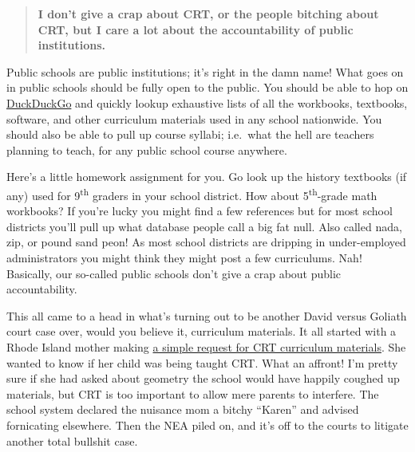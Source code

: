 \begin{quote}
\textbf{I don't give a crap about CRT, or the people bitching about CRT,
but I care a lot about the accountability of public institutions.}
\end{quote}

Public schools are public institutions; it's right in the damn name!
What goes on in public schools should be fully open to the public. You
should be able to hop on \href{https://duckduckgo.com/}{DuckDuckGo} and
quickly lookup exhaustive lists of all the workbooks, textbooks,
software, and other curriculum materials used in any school nationwide.
You should also be able to pull up course syllabi; i.e.~what the hell
are teachers planning to teach, for any public school course anywhere.

Here's a little homework assignment for you. Go look up the history
textbooks (if any) used for 9\textsuperscript{th} graders in your school
district. How about 5\textsuperscript{th}-grade math workbooks? If
you're lucky you might find a few references but for most school
districts you'll pull up what database people call a big fat null. Also
called nada, zip, or pound sand peon! As most school districts are
dripping in under-employed administrators you might think they might
post a few curriculums. Nah! Basically, our so-called public schools
don't give a crap about public accountability.

This all came to a head in what's turning out to be another David versus
Goliath court case over, would you believe it, curriculum materials. It
all started with a Rhode Island mother making
\href{https://nypost.com/2021/08/05/teachers-union-sues-mom-over-requests-for-crt-curriculum-info/}{a
simple request for CRT curriculum materials}. She wanted to know if her
child was being taught CRT. What an affront! I'm pretty sure if she had
asked about geometry the school would have happily coughed up materials,
but CRT is too important to allow mere parents to interfere. The school
system declared the nuisance mom a bitchy ``Karen'' and advised
fornicating elsewhere. Then the NEA piled on, and it's off to the courts
to litigate another total bullshit case.



